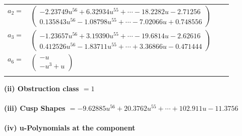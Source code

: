 \documentclass[1p]{elsarticle_modified}
\theoremstyle{definition}
\begin{document}
\begin{tabular}{m{7pt} m{180pt} m{7pt} m{180pt} }
\flushright $a_{2}=$&$\begin{pmatrix}-2.23749 u^{56}+6.32934 u^{55}+\cdots-18.2282 u-2.71256\\0.135843 u^{56}-1.08798 u^{55}+\cdots-7.02066 u+0.748556\end{pmatrix}$ \\
\flushright $a_{3}=$&$\begin{pmatrix}-1.23657 u^{56}+3.19390 u^{55}+\cdots-19.6814 u-2.62616\\0.412526 u^{56}-1.83711 u^{55}+\cdots+3.36866 u-0.471444\end{pmatrix}$ \\
\flushright $a_{6}=$&$\begin{pmatrix}- u\\- u^3+u\end{pmatrix}$\\&\end{tabular}
\flushleft \textbf{(ii) Obstruction class $= 1$}\\~\\
\flushleft \textbf{(iii) Cusp Shapes $= -9.62885 u^{56}+20.3762 u^{55}+\cdots+102.911 u-11.3756$}\\~\\
\newpage\renewcommand{\arraystretch}{1}
\flushleft \textbf{(iv) u-Polynomials at the component}\newline \\
\end{document}
